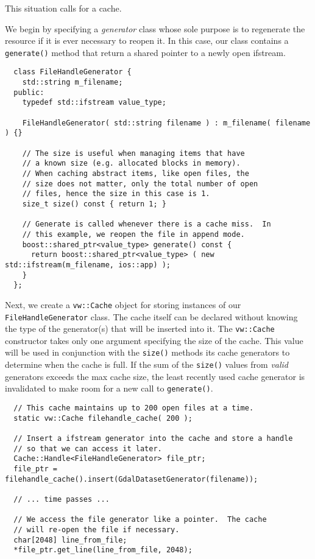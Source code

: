 This situation calls for a cache.  

We begin by specifying a {\em generator} class whose sole purpose is
to regenerate the resource if it is ever necessary to reopen it.  In
this case, our class contains a \verb#generate()# method that return a
shared pointer to a newly open ifstream.  

\begin{verbatim}
  class FileHandleGenerator {
    std::string m_filename;
  public:
    typedef std::ifstream value_type;

    FileHandleGenerator( std::string filename ) : m_filename( filename ) {}
    
    // The size is useful when managing items that have
    // a known size (e.g. allocated blocks in memory).
    // When caching abstract items, like open files, the
    // size does not matter, only the total number of open 
    // files, hence the size in this case is 1.
    size_t size() const { return 1; }

    // Generate is called whenever there is a cache miss.  In 
    // this example, we reopen the file in append mode.
    boost::shared_ptr<value_type> generate() const {
      return boost::shared_ptr<value_type> ( new std::ifstream(m_filename, ios::app) );
    }
  };
\end{verbatim}

Next, we create a \verb#vw::Cache# object for storing instances of our
\verb#FileHandleGenerator# class.  The cache itself can be declared
without knowing the type of the generator(s) that will be inserted
into it.  The \verb#vw::Cache# constructor takes only one argument
specifying the size of the cache.  This value will be used in
conjunction with the \verb#size()# methods its cache generators to
determine when the cache is full.  If the sum of the \verb#size()#
values from {\em valid} generators exceeds the max cache size, the
least recently used cache generator is invalidated to make room for a
new call to \verb#generate()#.

\begin{verbatim}
  // This cache maintains up to 200 open files at a time.
  static vw::Cache filehandle_cache( 200 );

  // Insert a ifstream generator into the cache and store a handle 
  // so that we can access it later.
  Cache::Handle<FileHandleGenerator> file_ptr;
  file_ptr = filehandle_cache().insert(GdalDatasetGenerator(filename));

  // ... time passes ...

  // We access the file generator like a pointer.  The cache 
  // will re-open the file if necessary.
  char[2048] line_from_file;
  *file_ptr.get_line(line_from_file, 2048);
\end{verbatim}

